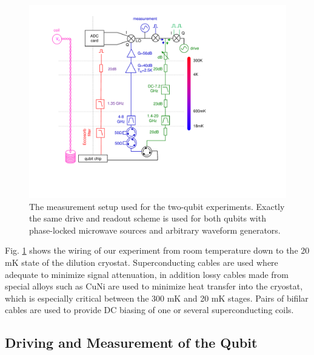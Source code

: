 \begin{figure}[ht!]
	\centering
		\includegraphics[width=1.\textwidth]{"./material/figures/2-qubit-processor/measurement setup"}
	\caption[The measurement setup used for the two-qubit experiments]{The measurement setup used for the two-qubit experiments. Exactly the same drive and readout scheme is used for both qubits with phase-locked microwave sources and arbitrary waveform generators.}
	\label{fig:measurement_setup}
\end{figure}

Fig. \ref{fig:measurement_setup} shows the wiring of our experiment from room temperature down to the 20 mK state of the dilution cryostat. Superconducting cables are used where adequate to minimize signal attenuation, in addition lossy cables made from special alloys such as CuNi are used to minimize heat transfer into the cryostat, which is especially critical between the 300 mK and 20 mK stages. Pairs of bifilar cables are used to provide DC biasing of one or several superconducting coils.

\subsection{Driving and Measurement of the Qubit}


